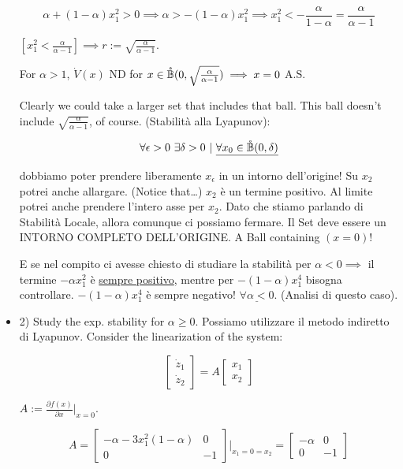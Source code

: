 \begin{itemize}
\[
	\alpha + (1-\alpha)x_1^2>0 \implies \alpha>-(1-\alpha)x_1^2 \implies x_1^2 < -\frac{\alpha}{1-\alpha} = \frac{\alpha}{\alpha-1}
\]

$[x_1^2 < \frac{\alpha}{\alpha-1}] \implies r := \sqrt{\frac{\alpha}{\alpha-1}}$.

For $\alpha>1$, $\dot{V}(x)$ ND for $x\in\mathring{\mathbb{B}}(0,\sqrt{\frac{\alpha}{\alpha-1}}) \implies x=0$ A.S.

Clearly we could take a larger set that includes that ball. This ball doesn't include $\sqrt{\frac{\alpha}{\alpha-1}}$, of course. (Stabilità alla Lyapunov):

\[
	\forall\epsilon>0\ \exists\delta>0\ |\ \underline{\forall x_0\in\oball(0,\delta)}
\]

dobbiamo poter prendere liberamente $x_\epsilon$ in un intorno dell'origine! Su $x_2$ potrei anche allargare. (Notice that\dots) $x_2$ è un termine positivo. Al limite potrei anche prendere l'intero asse per $x_2$. Dato che stiamo parlando di Stabilità Locale, allora comunque ci possiamo fermare. Il Set deve essere un INTORNO COMPLETO DELL'ORIGINE. A Ball containing $(x=0)$!

E se nel compito ci avesse chiesto di studiare la stabilità per $\alpha<0 \implies$ il termine $-\alpha x_1^2$ è \underline{sempre positivo}, mentre per $-(1-\alpha)x_1^4$ bisogna controllare. $-(1-\alpha)x_1^4$ è sempre negativo! $\underline{\forall \alpha<0}$. (Analisi di questo caso).

\item{2)} Study the exp. stability for $\alpha\geq 0$. Possiamo utilizzare il metodo indiretto di Lyapunov. Consider the linearization of the system:

\[
	\begin{bmatrix}\dot{z}_1\\ \dot{z}_2\end{bmatrix} = A\begin{bmatrix}x_1\\x_2\end{bmatrix}
\]

$A := \frac{\partial{f(x)}}{\partial{x}}|_{x=0}$.

\[
	A = \begin{bmatrix}-\alpha-3x_1^2(1-\alpha)&0\\0&-1\end{bmatrix}|_{x_1=0=x_2} = \begin{bmatrix}-\alpha&0\\0&-1\end{bmatrix}
\]


\end{itemize}
